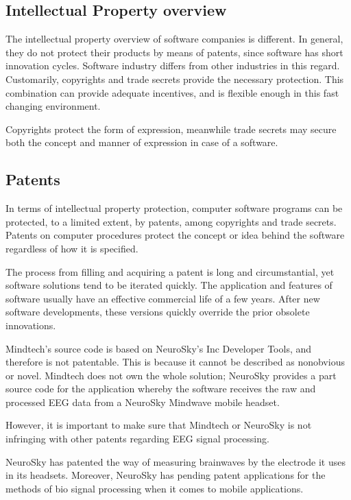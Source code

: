 \documentclass[letterpaper,10pt]{article}
\let\oldsubsection\subsection
\renewcommand{\subsection}{\def\cursectioning{subsection}\oldsubsection}
\begin{document}
\subsection{Intellectual Property overview}

The intellectual property overview of software companies is different. In general, they do not protect their products by means of patents, since software has short innovation cycles. Software industry differs from other industries in this regard. Customarily, copyrights and trade secrets provide the necessary protection. This combination can provide adequate incentives, and is flexible enough in this fast changing environment.  \cite{goldman_2012}
 
Copyrights protect the form of expression, meanwhile trade secrets may secure both the concept and manner of expression in case of a software. \cite{patent_book}


\subsection{Patents}

In terms of intellectual property protection, computer software programs can be protected, to a limited extent, by patents, among copyrights and trade secrets. Patents on computer procedures protect the concept or idea behind the software regardless of how it is specified. \cite{goldman_2012}

The process from filling and acquiring a patent is long and circumstantial, yet software solutions tend to be iterated quickly. The application and features of software usually have an effective commercial life of a few years. After new software developments, these versions quickly override the prior obsolete innovations. 

Mindtech's source code is based on NeuroSky's Inc Developer Tools, and therefore is not patentable. This is because it cannot be described as nonobvious or novel. Mindtech does not own the whole solution; NeuroSky provides a part source code for the application whereby the software receives the raw and processed EEG data from a NeuroSky Mindwave mobile headset. 

However, it is important to make sure that Mindtech or NeuroSky is not infringing with other patents regarding EEG signal processing. 

NeuroSky has patented the way of measuring brainwaves by the electrode it uses in its headsets. Moreover, NeuroSky has pending patent applications for the methods of bio signal processing when it comes to mobile applications. 
\end{document}
